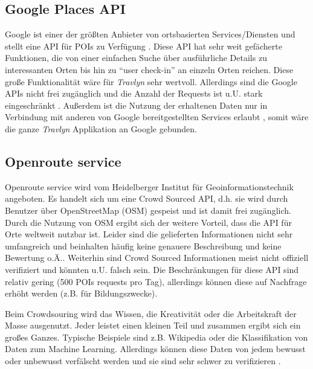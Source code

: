 \subsection{Google Places API}
Google ist einer der größten Anbieter von ortsbasierten Services/Diensten und stellt eine API für POIs zu Verfügung \cite{Google.01.02.2020}. Diese API hat sehr weit gefächerte Funktionen, die von einer einfachen Suche über ausführliche Details zu interessanten Orten bis hin zu \enquote{user check-in} an einzeln Orten reichen. Diese große Funktionalität wäre für \textit{Travlyn} sehr wertvoll. Allerdings sind die Google APIs nicht frei zugänglich und die Anzahl der Requests ist u.U. stark eingeschränkt \cite{Singhal.2012}. Außerdem ist die Nutzung der erhaltenen Daten nur in Verbindung mit anderen von Google bereitgestellten Services erlaubt \cite{Google.02.12.2019}, somit wäre die ganze \textit{Travlyn} Applikation an Google gebunden.  

\subsection{Openroute service}
Openroute service \cite{TheHeidelbergInstituteforGeoinformationTechnology.} wird vom Heidelberger Institut für Geoinformationstechnik angeboten. Es handelt sich um eine Crowd Sourced API, d.h. sie wird durch Benutzer über OpenStreetMap (OSM) \cite{OpenStreetMap.} gespeist und ist damit frei zugänglich. Durch die Nutzung von OSM ergibt sich der weitere Vorteil, dass die API für Orte weltweit nutzbar ist. Leider sind die gelieferten Informationen nicht sehr umfangreich und beinhalten häufig keine genauere Beschreibung und keine Bewertung o.Ä.. Weiterhin sind Crowd Sourced Informationen meist nicht offiziell verifiziert und könnten u.U. falsch sein. Die Beschränkungen für diese API sind relativ gering (500 POIs requests pro Tag), allerdings können diese auf Nachfrage erhöht werden (z.B. für Bildungszwecke).

\begin{defStrich}[Crowdsourcing]
	Beim Crowdsouring wird das Wissen, die Kreativität oder die Arbeitskraft der Masse ausgenutzt. Jeder leistet einen kleinen Teil und zusammen ergibt sich ein großes Ganzes. Typische Beispiele sind z.B. Wikipedia oder die Klassifikation von Daten zum Machine Learning. Allerdings können diese Daten von jedem bewusst oder unbewusst verfälscht werden und sie sind sehr schwer zu verifizieren \cite{Winkler.2009}. 
\end{defStrich}

